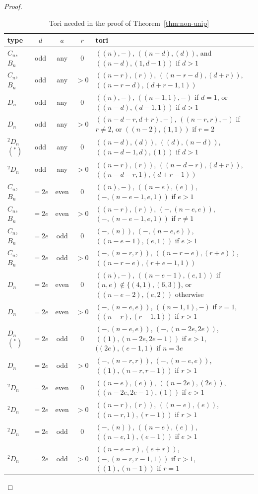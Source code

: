 \documentclass{ert-l}
\theoremstyle{definition}
\theoremstyle{remark}
\begin{document}
\begin{proof}
\begin{table}\label{tab:non-unip}
\caption{Tori needed in the proof of Theorem~\ref{thm:non-unip}}
\begin{tabular}{|l|c|c|c|p{}|}
\hline
type&$d$&$a$&$r$&tori\\
\hline
$C_n$,$B_n$&odd&any&$0$&$((n),-)$, $((n-d),(d))$, and $((n-d),(1,d-1))$ if
$d>1$\\
$C_n$,$B_n$&odd&any&$>0$&$((n-r),(r))$, $((n-r-d),(d+r))$,
$((n-r-d),(d+r-1, 1))$\\
$D_n$&odd&any&0&$((n),-)$, $((n-1,1),-)$ if $d=1$, or $((n-d),(d-1,1))$ if
$d>1$\\
$D_n$&odd&any&$>0$&$((n-d-r, d+r),-)$, $((n-r,r),-)$ if $r \neq 2$, or
$((n-2),(1,1))$ if $r=2$\\
$^2D_n$$(^*)$&odd&any&0&$((n-d),(d))$, $((d),(n-d))$, $((n-d-1,d),(1))$ if
$d>1$\\
$^2D_n$&odd&any&$>0$&$((n-r),(r))$, $((n-d-r),(d+r))$, $((n-d-r,1),(d+r-1))$\\
$C_n$,$B_n$&$=2e$&even&$0$&$((n),-)$, $((n-e),(e))$, $(-,(n-e-1,e,1))$ if
$e>1$\\
$C_n$,$B_n$&$=2e$&even&$>0$&$((n-r),(r))$, $(-,(n-e,e))$, $(-,(n-e-1,e,1))$
if $r\neq 1$\\
$C_n$,$B_n$&$=2e$&odd&$0$&$(-,(n))$, $(-,(n-e,e))$, $((n-e-1),(e,1))$ if
$e>1$\\
$C_n$,$B_n$&$=2e$&odd&$>0$&$(-,(n-r,r))$, $((n-r-e),(r+e))$,
$((n-r-e),(r+e-1,1))$\\
$D_n$&$=2e$&even&$0$&$((n),-)$, $((n-e-1),(e,1))$ if $(n,e) \notin
\{(4,1),(6,3)\}$, or $((n-e-2),(e,2))$ otherwise\\
$D_n$&$=2e$&even&$>0$&$(-,(n-e,e))$, $((n-1,1),-)$ if $r=1$,
$((n-r),(r-1,1))$ if $r>1$\\
$D_n$$(^*)$&$=2e$&odd&$0$&$(-,(n-e,e))$, $(-,(n-2e,2e))$,
$((1), (n-2e, 2e-1))$ if $e>1$, $((2e),(e-1,1)$ if $n=3e$ \\
$D_n$&$=2e$&odd&$>0$&$(-,(n-r,r))$, $(-,(n-e,e))$, $((1),(n-r,r-1))$ if
$r>1$\\
$^2D_n$&$=2e$&even&$0$&$((n-e),(e))$, $((n-2e),(2e))$, $((n-2e, 2e-1),(1))$
if $e>1$\\
$^2D_n$&$=2e$&even&$>0$&$((n-r),(r))$, $((n-e),(e))$, $((n-r,1),(r-1))$ if
$r>1$\\
$^2D_n$&$=2e$&odd&$0$&$(-,(n))$, $((n-e),(e))$, $((n-e,1),(e-1))$ if $e>1$\\
$^2D_n$&$=2e$&odd&$>0$&$((n-e-r),(e+r))$, $(-,(n-r,r-1,1))$
if $r>1$, $((1),(n-1))$ if $r=1$\\
\hline
\end{tabular}
\end{table}


\end{proof}
\end{document}
